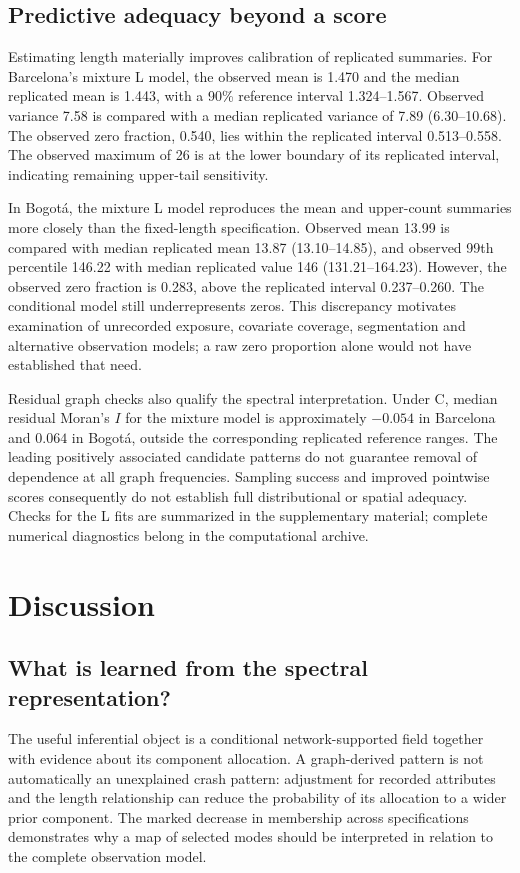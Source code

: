 \documentclass[11pt]{article}
\begin{document}
\FloatBarrier
\subsection{Predictive adequacy beyond a score}
Estimating length materially improves calibration of replicated summaries. For Barcelona's mixture L model, the observed mean is 1.470 and the median replicated mean is 1.443, with a 90\% reference interval 1.324--1.567. Observed variance 7.58 is compared with a median replicated variance of 7.89 (6.30--10.68). The observed zero fraction, 0.540, lies within the replicated interval 0.513--0.558. The observed maximum of 26 is at the lower boundary of its replicated interval, indicating remaining upper-tail sensitivity.

In Bogot\'a, the mixture L model reproduces the mean and upper-count summaries more closely than the fixed-length specification. Observed mean 13.99 is compared with median replicated mean 13.87 (13.10--14.85), and observed 99th percentile 146.22 with median replicated value 146 (131.21--164.23). However, the observed zero fraction is 0.283, above the replicated interval 0.237--0.260. The conditional model still underrepresents zeros. This discrepancy motivates examination of unrecorded exposure, covariate coverage, segmentation and alternative observation models; a raw zero proportion alone would not have established that need.

Residual graph checks also qualify the spectral interpretation. Under C, median residual Moran's $I$ for the mixture model is approximately $-0.054$ in Barcelona and $0.064$ in Bogot\'a, outside the corresponding replicated reference ranges. The leading positively associated candidate patterns do not guarantee removal of dependence at all graph frequencies. Sampling success and improved pointwise scores consequently do not establish full distributional or spatial adequacy. Checks for the L fits are summarized in the supplementary material; complete numerical diagnostics belong in the computational archive.

\section{Discussion}
\subsection{What is learned from the spectral representation?}
The useful inferential object is a conditional network-supported field together with evidence about its component allocation. A graph-derived pattern is not automatically an unexplained crash pattern: adjustment for recorded attributes and the length relationship can reduce the probability of its allocation to a wider prior component. The marked decrease in membership across specifications demonstrates why a map of selected modes should be interpreted in relation to the complete observation model.
\end{document}
